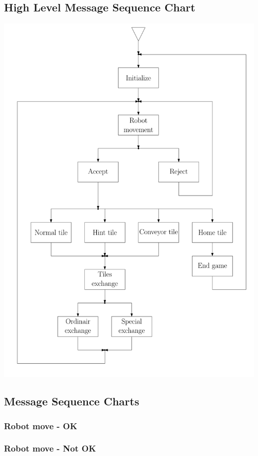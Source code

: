 \subsection{High Level Message Sequence Chart}
	\includegraphics[width=\linewidth,bb=0 0 680 1000]{MSC-files/HMSC.pdf}
	
\subsection{Message Sequence Charts}
	\subsubsection{Robot move - OK}
		
	
	\subsubsection{Robot move - Not OK}
	
	
